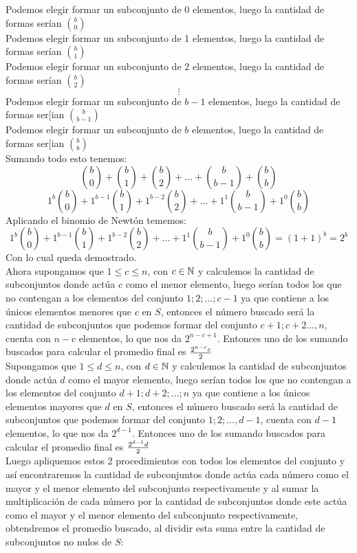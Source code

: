 \documentclass{book}
\begin{document}
\begin{enumerate}
        Podemos elegir formar un subconjunto de 0 elementos, luego la cantidad de formas serían  $\displaystyle{b \choose 0}$\\
        Podemos elegir formar un subconjunto de 1 elementos, luego la cantidad de formas serían  $\displaystyle{b \choose 1}$\\
        Podemos elegir formar un subconjunto de 2 elementos, luego la cantidad de formas serían  $\displaystyle{b \choose 2}$\\
        $$\vdots$$
        Podemos elegir formar un subconjunto de $b-1$ elementos, luego la cantidad de formas ser[ian  $\displaystyle{b \choose {b-1}}$\\
        Podemos elegir formar un subconjunto de $b$ elementos, luego la cantidad de formas ser[ian  $\displaystyle{b \choose b}$\\
        Sumando todo esto tenemos:
        $${b \choose 0}+{b \choose 1}+{b \choose 2}+\ldots +{b \choose {b-1}}+{b \choose b}$$
        $$1^b {b \choose 0}+1^{b-1} {b \choose 1}+1^{b-2} {b \choose 2}+\ldots +1^1 {b \choose {b-1}}+1^0 {b \choose b}$$
        Aplicando el binomio de Newtón tememos:
        $$1^b {b \choose 0}+1^{b-1} {b \choose 1}+1^{b-2} {b \choose 2}+\ldots +1^1 {b \choose {b-1}}+1^0 {b \choose b}={(1+1)}^b=2^b$$
        Con lo cual queda demostrado.\\
        Ahora supongamos que $1\leq c\leq n$, con $c\in \mathbb{N}$ y calculemos la cantidad de subconjuntos donde actúa $c$ como el menor elemento, luego serían todos los que no contengan a los elementos del conjunto ${1;2;\ldots;c-1}$ ya que contiene a los únicos elementos menores que $c$ en $S$, entonces el número buscado será la cantidad de subconjuntos que podemos formar del conjunto ${c+1;c+2\ldots ,n}$, cuenta con $n-c$ elementos, lo que nos da $2^{n-c+1}$. Entonces uno de los sumando buscados para calcular el promedio final es ${2^{n-c}c\over 2}$\\
        Supongamos que $1\leq d\leq n$, con $d\in \mathbb{N}$ y calculemos la cantidad de subconjuntos donde actúa $d$ como el mayor elemento, luego serían todos los que no contengan a los elementos del conjunto ${d+1;d+2;\ldots;n}$ ya que contiene a los únicos elementos mayores que $d$ en $S$, entonces el número buscado será la cantidad de subconjuntos que podemos formar del conjunto ${1;2;\ldots ,d-1}$, cuenta con $d-1$ elementos, lo que nos da $2^{d-1}$. Entonces uno de los sumando buscados para calcular el promedio final es ${2^{d-1}d\over 2}$\\
        Luego apliquemos estos 2 procedimientos con todos los elementos del conjunto y así encontraremos la cantidad de subconjuntos donde actúa cada número como el mayor y el menor elemento del subconjunto respectivamente y al sumar la multiplicación de cada número por la cantidad de subconjuntos donde este actúa como el mayor y el menor elemento del subconjunto respectivamente, obtendremos el promedio buscado, al dividir esta suma entre la cantidad de subconjuntos no nulos de $S$:

\end{enumerate}
\end{document}
